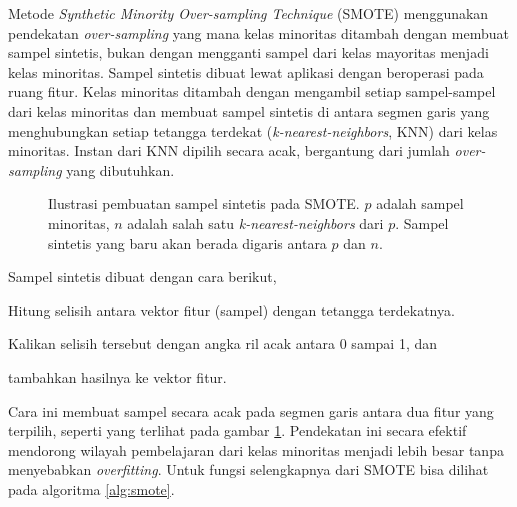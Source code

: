 Metode \textit{Synthetic Minority Over-sampling Technique} (SMOTE)
\cite{chawla2002smote} menggunakan pendekatan \textit{over-sampling} yang mana
kelas minoritas ditambah dengan membuat sampel sintetis, bukan dengan
mengganti sampel dari kelas mayoritas menjadi kelas minoritas.
Sampel sintetis dibuat lewat aplikasi dengan beroperasi pada
ruang fitur.
Kelas minoritas ditambah dengan mengambil setiap sampel-sampel dari kelas
minoritas dan membuat sampel sintetis di antara segmen garis yang menghubungkan
setiap tetangga terdekat (\textit{k-nearest-neighbors}, KNN) dari kelas
minoritas.
Instan dari KNN dipilih secara acak, bergantung dari jumlah
\textit{over-sampling} yang dibutuhkan.

\begin{figure}[htbp]
\centering
\setlength\fboxsep{4pt}
	\caption{
	Ilustrasi pembuatan sampel sintetis pada SMOTE.
	$p$ adalah sampel minoritas, $n$ adalah salah satu
	\textit{k-nearest-neighbors} dari $p$.
	Sampel sintetis yang baru akan berada digaris antara $p$ dan $n$.
	}
	\label{fig:smote}
\end{figure}

Sampel sintetis dibuat dengan cara berikut,
\begin{compactitem}%
	\item Hitung selisih antara vektor fitur (sampel) dengan tetangga
	terdekatnya.
	\item Kalikan selisih tersebut dengan angka ril acak antara 0 sampai 1,
	dan
	\item tambahkan hasilnya ke vektor fitur.
\end{compactitem}

Cara ini membuat sampel secara acak pada segmen garis antara dua fitur yang
terpilih, seperti yang terlihat pada gambar \ref{fig:smote}.
Pendekatan ini secara efektif mendorong wilayah pembelajaran dari kelas
minoritas menjadi lebih besar tanpa menyebabkan \textit{overfitting}.
Untuk fungsi selengkapnya dari SMOTE bisa dilihat pada algoritma \ref{alg:smote}.


